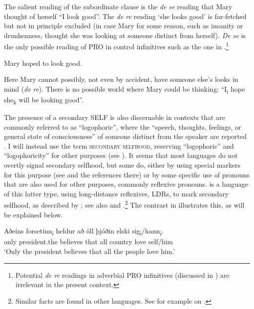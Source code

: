 \documentclass[output=paper]{LSP/langsci}
\begin{document}
The salient reading of the subordinate clause is the \textit{de se} reading that Mary thought of herself “I look good”. The \textit{de re} reading `she looks good’ is far-fetched but not in principle excluded (in case Mary for some reason, such as insanity or drunkenness, thought she was looking at someone distinct from herself). \textit{De se} is the only possible reading of PRO in control infinitives such as the one in  \citep{Chierchia1989}.\footnote{Potential \textit{de re} readings in adverbial PRO infinitives (discussed in \citealt[32–33]{Landau2013}) are irrelevant in the present context.}

\ea%
    \label{ex:Sigurdsson:16}
  Mary hoped to look good.
\z

Here Mary cannot possibly, not even by accident, have someone else’s looks in mind (\textit{de re}). There is no possible world where Mary could be thinking: “I\textsubscript{i} hope she\textsubscript{k} will be looking good”.

  The presence of a secondary SELF is also discernable in contexts that are commonly referred to as ``logophoric'', where the “speech, thoughts, feelings, or general state of consciousness” of someone distinct from the speaker are reported \citep[141]{Clements1975}. I will instead use the term \textsc{secondary selfhood}, reserving ``logophoric'' and ``logophoricity'' for other purposes (see ). It seems that most languages do not overtly signal secondary selfhood, but some do, either by using special markers for this purpose (see \citealt{Sells1987} and the references there) or by some specific use of pronouns that are also used for other purposes, commonly reflexive pronouns.  is a language of this latter type, using long-distance reflexives, LDRs, to mark secondary selfhood, as described by \citet{Thráinsson1976,Thráinsson1990,Thráinsson2007}; see also \citealt{Maling1984} and \citealt{Sigurðsson1990}.\footnote{Similar facts are found in other languages. See for example \citealt{Giorgi2006} on .} The contrast in  illustrates this, as will be explained below.

\ea%
    \label{ex:Sigurdsson:17}
\gll  Aðeins  forsetinn\textsubscript{i}  heldur  að  öll  þjóðin  elski sig\textsubscript{i}/hann\textsubscript{i}.\\
  only  president.the  believes  that  all  country  love  self/him\\
\glt ‘Only the president believes that all the people love him.’
\z
\end{document}

